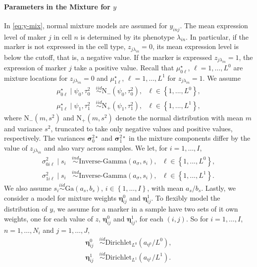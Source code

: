 \documentclass[12pt,]{article}
\newcommand{\bc}[1]{ \left\{#1\right\} }
\newcommand{\N}{ \mathcal{N} }
\newcommand{\iid}{\overset{iid}{\sim}}
\newcommand{\ind}{\overset{ind}{\sim}}
\def\N{\text{N}}
\def\G{\text{Ga}}
\def\IG{\text{Inverse-Gamma}}
\def\Dir{\text{Dirichlet}}
\def\mus{\mu^\star}
\def\bsig{\bm{\sigma}}
\begin{document}
\paragraph*{Parameters in the Mixture for $y$}
In \eqref{eq:y-mix}, normal mixture models are assumed for $y_{inj}$. The mean
expression level of maker $j$ in cell $n$ is determined by its phenotype
$\lambda_{in}$.  In particular, if the marker is not expressed in the cell
type, $z_{j \lambda_{in}}=0$, its mean expression level is below the cutoff,
that is, a negative value.  If the marker is expressed $z_{j \lambda_{in}}=1$,
the expression of marker $j$ take a positive value.   Recall that
$\mus_{0\ell}$, $\ell=1, \ldots, L^0$ are mixture locations for $z_{j
\lambda_{in}}=0$ and $\mus_{1\ell}$, $\ell=1, \ldots, L^1$ for $z_{j
\lambda_{in}}=1$.  We assume 
\begin{align*}
\mus_{0\ell} \mid \psi_0, \tau^2_0 &\iid \N_-(\psi_0, \tau^2_0), ~~~ \ell \in \bc{1,...,L^0}, \\
\mus_{1\ell} \mid \psi_1, \tau^2_1 &\iid \N_+(\psi_1, \tau^2_1), ~~~ \ell \in \bc{1,...,L^1}, 
\end{align*}
where \(\N_-(m,s^2)\) and \(\N_+(m,s^2)\) denote the normal distribution with
mean \(m\) and variance \(s^2\), truncated to take only negative values and
positive values, respectively.  The variances $\bsig^{2 \star}_0$ and $\bsig^{2
\star}_1$ in the mixture components differ by the value of $z_{j \lambda_{in}}$
and also vary across samples. We let, for \(i=1, \ldots, I\),
\begin{align*}
\sigma^2_{0i\ell} \mid s_i &\ind \IG(a_\sigma, s_i), ~~~ \ell \in \bc{1,...,L^0}, \\
\sigma^2_{1i\ell} \mid s_i &\ind \IG(a_\sigma, s_i), ~~~ \ell \in \bc{1,...,L^1}.  
\end{align*}
We also assume $s_i \iid \G(a_s, b_s)$, $i \in \bc{1,...,I}$, with mean
\(a_s/b_s\). Lastly, we consider a model for mixture weights $\bm\eta^0_{ij}$
and $\bm\eta^1_{ij}$. To flexibly model the distribution of $y$, we assume for
a marker in a sample have two sets of it own weights, one for each value of
$z$, $\bm\eta^0_{ij}$ and $\bm\eta^1_{ij}$, for each $(i, j)$. So for \(i=1,
\ldots, I\), \(n=1, \ldots, N_i\) and \(j=1, \ldots, J\),
\begin{align*}
\bm\eta^0_{ij} &\iid \Dir_{L^0}(a_{\eta^0}/L^0), \\
\bm\eta^1_{ij} &\iid \Dir_{L^1}(a_{\eta^1}/L^1). 
\end{align*}
\end{document}
